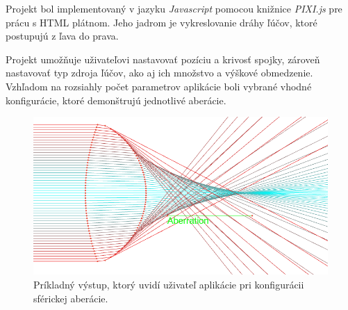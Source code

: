 Projekt bol implementovaný v jazyku \textit{Javascript} pomocou knižnice \textit{PIXI.js} pre prácu
s HTML plátnom. Jeho jadrom je vykreslovanie dráhy ľúčov, ktoré postupujú z ľava do prava. 

Projekt umožňuje uživateľovi nastavovať pozíciu a krivosť spojky, zároveň nastavovať typ zdroja 
ľúčov, ako aj ich množstvo a výškové obmedzenie. Vzhľadom na rozsiahly počet parametrov aplikácie
boli vybrané vhodné konfigurácie, ktoré demonštrujú jednotlivé aberácie.


\begin{figure}
\includegraphics[scale=0.4]{obrazky-figures/application.png}
    \centering \caption{Príkladný výstup, ktorý uvidí uživateľ aplikácie pri konfigurácii sférickej aberácie.}
\end{figure}


